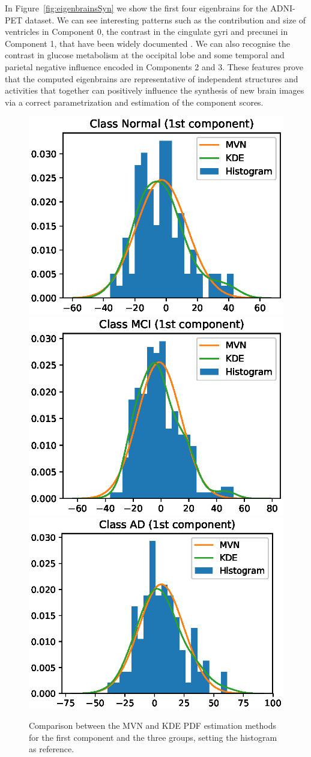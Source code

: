 In Figure~\ref{fig:eigenbrainsSyn} we show the first four eigenbrains for the ADNI-PET dataset. We can see interesting patterns such as the contribution and size of ventricles in Component 0, the contrast in the cingulate gyri and precunei in Component 1, that have been widely documented \cite{Stoeckel04,Illan2011}. We can also recognise the contrast in glucose metabolism at the occipital lobe and some temporal and parietal negative influence encoded in Components 2 and 3. These features prove that the computed eigenbrains are representative of independent structures and activities that together can positively influence the synthesis of new brain images via a correct parametrization and estimation of the component scores. 


\begin{figure}[h]
	\centering
	\includegraphics[width=0.3\linewidth]{Graphics/ch8/compMethods_Normal1st}
	\includegraphics[width=0.3\linewidth]{Graphics/ch8/compMethods_MCI1st}
	\includegraphics[width=0.3\linewidth]{Graphics/ch8/compMethods_AD1st}
	\caption{Comparison between the \acs{MVN} and \acs{KDE} \acs{PDF} estimation methods for the first component and the three groups, setting the histogram as reference.}
	\label{fig:comparisonEstimatesSyn}
\end{figure}

